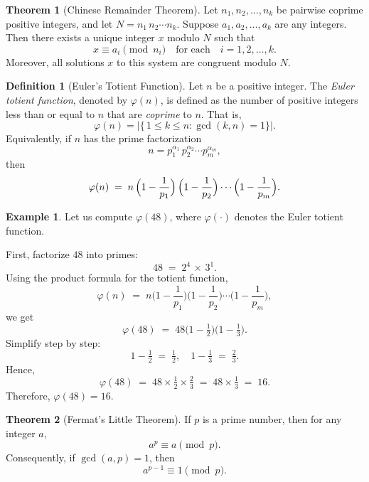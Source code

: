 \documentclass[12pt]{article}
\theoremstyle{definition} %
\newtheorem{theorem}{Theorem}
\newtheorem{definition}{Definition}
\newtheorem{example}{Example}
\theoremstyle{plain} %
\begin{document}
  \begin{theorem}[Chinese Remainder Theorem]
    Let $n_1, n_2, \ldots, n_k$ be pairwise coprime positive integers,
    and let $N = n_1\,n_2 \cdots n_k$. Suppose $a_1, a_2, \ldots, a_k$ 
    are any integers. Then there exists a unique integer $x$ modulo $N$ 
    such that
    \[
      x \equiv a_i \pmod{n_i} 
      \quad\text{for each}\quad i = 1, 2, \ldots, k.
    \]
    Moreover, all solutions $x$ to this system are congruent modulo $N$.
  \end{theorem} 

  \begin{definition}[Euler's Totient Function]
    Let $n$ be a positive integer. The \emph{Euler totient function},
    denoted by $\varphi(n)$, is defined as the number of positive integers 
    less than or equal to $n$ that are \emph{coprime} to $n$. That is,
    \[
      \varphi(n) = \bigl|\{\,1 \le k \le n : \gcd(k,n) = 1\}\bigr|.
    \]
    Equivalently, if $n$ has the prime factorization
    \[
      n = p_1^{\alpha_1}\,p_2^{\alpha_2}\cdots p_m^{\alpha_m},
    \]
    then
    \[
      \varphi(n) \;=\; n \,\Bigl(1 - \frac{1}{p_1}\Bigr)
                       \,\Bigl(1 - \frac{1}{p_2}\Bigr)\cdots
                       \Bigl(1 - \frac{1}{p_m}\Bigr).
    \]
  \end{definition}


\begin{example}
    Let us compute $\varphi(48)$, where $\varphi(\cdot)$ denotes the
    Euler totient function.
  
    \medskip
    First, factorize $48$ into primes:
    \[
      48 \;=\; 2^4 \,\times\, 3^1.
    \]
    Using the product formula for the totient function,
    \[
      \varphi(n) \;=\; n \biggl(1 - \frac{1}{p_1}\biggr)
                      \biggl(1 - \frac{1}{p_2}\biggr)
                      \cdots
                      \biggl(1 - \frac{1}{p_m}\biggr),
    \]
    we get
    \[
      \varphi(48)
      \;=\;
      48
      \bigl(1 - \tfrac{1}{2}\bigr)
      \bigl(1 - \tfrac{1}{3}\bigr).
    \]
    Simplify step by step:
    \[
      1 - \tfrac{1}{2} \;=\; \tfrac{1}{2},
      \quad
      1 - \tfrac{1}{3} \;=\; \tfrac{2}{3}.
    \]
    Hence,
    \[
      \varphi(48)
      \;=\;
      48 \times \tfrac{1}{2} \times \tfrac{2}{3}
      \;=\;
      48 \times \tfrac{1}{3}
      \;=\;
      16.
    \]
    Therefore, $\varphi(48) = 16$.
  \end{example}


\begin{theorem}[Fermat's Little Theorem]
    If $p$ is a prime number, then for any integer $a$,
    \[
      a^p \equiv a \pmod{p}.
    \]
    Consequently, if $\gcd(a,p) = 1$, then
    \[
      a^{p-1} \equiv 1 \pmod{p}.
    \]
  \end{theorem}
  
\end{document}
